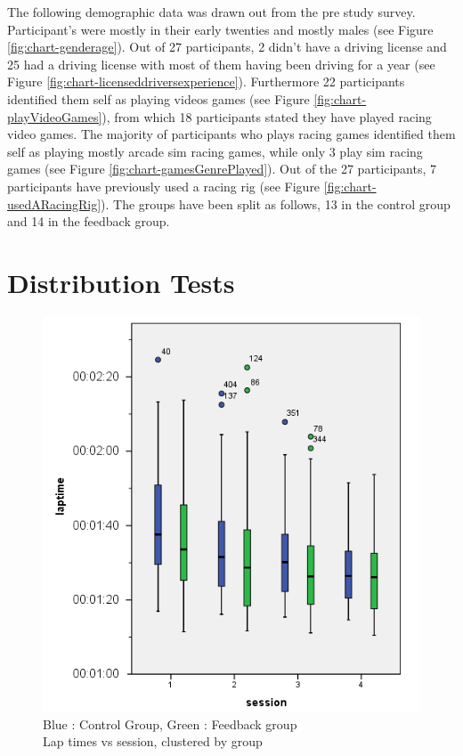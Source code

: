 The following demographic data was drawn out from the pre study survey. Participant's were mostly in their early twenties and mostly males (see Figure \ref{fig:chart-genderage}). Out of 27 participants, 2 didn't have a driving license and 25 had a driving license with most of them having been driving for a year (see Figure \ref{fig:chart-licenseddriversexperience}). Furthermore 22 participants identified them self as playing videos games (see Figure \ref{fig:chart-playVideoGames}), from which 18 participants stated they have played racing video games. The majority of participants who plays racing games identified them self as playing mostly arcade sim racing games, while only 3 play sim racing games (see Figure \ref{fig:chart-gamesGenrePlayed}). Out of the 27 participants, 7 participants have previously used a racing rig (see Figure \ref{fig:chart-usedARacingRig}). The groups have been split as follows, 13 in the control group and 14 in the feedback group.

\section{Distribution Tests}
\label{sec:eval-distTests}

\begin{figure}[!htb]
	\centering
	\includegraphics[width=\textwidth]{charts/laptimes.png}
	\caption[Lap times vs session, clustered by group]{Blue : Control Group, Green : Feedback group \\ Lap times vs session, clustered by group}
	\label{fig:chart-laptimes}
\end{figure}

